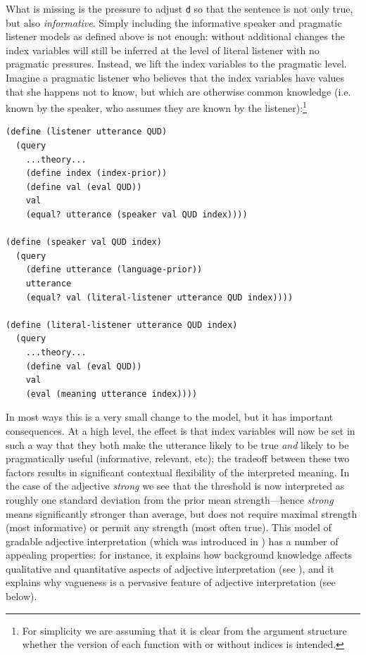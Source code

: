\documentclass[pdfextras]{handbook}
\begin{document}
What is missing is the pressure to adjust \lstinline{d} so that the sentence is not only true, but also \emph{informative}. 
Simply including the informative speaker and pragmatic listener models as defined above is not enough: without additional changes the index variables will still be inferred at the level of literal listener with no pragmatic pressures. 
Instead, we lift the index variables to the pragmatic level. 
Imagine a pragmatic listener who believes that the index variables have values that she happens not to know, but which are otherwise common knowledge (i.e. known by the speaker, who assumes they are known by the listener):\footnote{For simplicity we are assuming that it is clear from the argument structure whether the version of each function with or without indices is intended.}
\begin{lstlisting}
(define (listener utterance QUD)
  (query
    ...theory...
    (define index (index-prior))
    (define val (eval QUD))
    val
    (equal? utterance (speaker val QUD index))))
    
(define (speaker val QUD index)
  (query
    (define utterance (language-prior))
    utterance
    (equal? val (literal-listener utterance QUD index))))

(define (literal-listener utterance QUD index)
  (query
    ...theory...
    (define val (eval QUD))
    val
    (eval (meaning utterance index))))
\end{lstlisting}
In most ways this is a very small change to the model, but it has important consequences. 
At a high level, the effect is that index variables will now be set in such a way that they both make the utterance likely to be true \emph{and} likely to be pragmatically useful (informative, relevant, etc); the tradeoff between these two factors results in significant contextual flexibility of the interpreted meaning. 
In the case of the adjective \emph{strong} we see  that the threshold is now interpreted as roughly one standard deviation from the prior mean strength---hence \emph{strong} means significantly stronger than average, but does not require maximal strength (most informative) or permit any strength (most often true). 
This model of gradable adjective interpretation (which was introduced in \cite{Lassiter2013}) has a number of appealing properties: for instance, it explains how background knowledge affects qualitative and quantitative aspects of adjective interpretation (see \cite{Lassiter2013}), and it explains why vagueness is a pervasive feature of adjective interpretation (see below).
\end{document}

